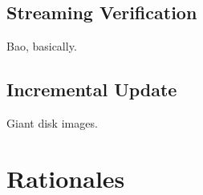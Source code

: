 \documentclass[12pt,notitlepage,a4paper]{article}
\begin{document}
\subsection{Streaming Verification}\label{sec:streamingverification}

Bao, basically.

\subsection{Incremental Update}\label{sec:incrementalupdate}

Giant disk images.

\section{Rationales}\label{sec:rationales}




\end{document}
